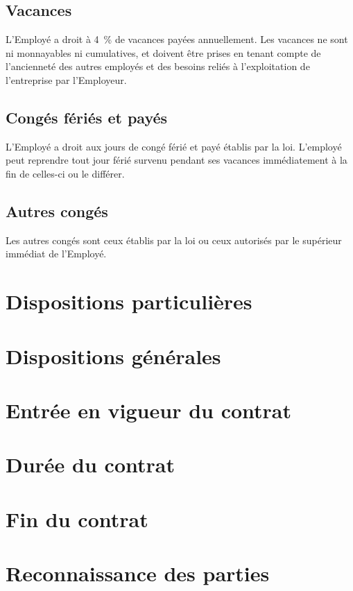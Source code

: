 \documentclass{article}
\begin{document}
    	\subsection{Vacances}
    	L'Employé a droit à \SI{4}{\%} de vacances payées annuellement. Les vacances ne sont ni monnayables ni cumulatives, et doivent être prises en tenant compte de l'ancienneté des autres employés et des besoins reliés à l'exploitation de l'entreprise par l'Employeur.
    	
    	\subsection{Congés fériés et payés}
    	L'Employé a droit aux jours de congé férié et payé établis par la loi. L'employé peut reprendre tout jour férié survenu pendant ses vacances immédiatement à la fin de celles-ci ou le différer.
    	
    	\subsection{Autres congés}
    	Les autres congés sont ceux établis par la loi ou ceux autorisés par le supérieur immédiat de l'Employé.
    
    \section{Dispositions particulières}
    \lipsumC
    \section{Dispositions générales}
    \lipsumC
    \section{Entrée en vigueur du contrat}
    \lipsumC
    \section{Durée du contrat}
    \lipsumC
    \section{Fin du contrat}
    \lipsumC
    \section{Reconnaissance des parties}
    \lipsumC
    
    

    
    
        
\end{document}
